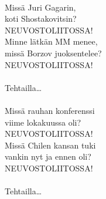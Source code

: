 \hspace{10mm} \\
            Missä Juri Gagarin, \\
            koti Shostakovitsin? \\
            NEUVOSTOLIITOSSA! \\
            Minne lätkän MM menee, \\
            missä Borzov juoksentelee? \\
            NEUVOSTOLIITOSSA! \\
\hspace{10mm} \\
            Tehtailla… \\
\hspace{10mm} \\
            Missä rauhan konferenssi \\
            viime lokakuussa oli? \\
            NEUVOSTOLIITOSSA! \\
            Missä Chilen kansan tuki \\
            vankin nyt ja ennen oli? \\
            NEUVOSTOLIITOSSA! \\
\hspace{10mm} \\
            Tehtailla… \\
